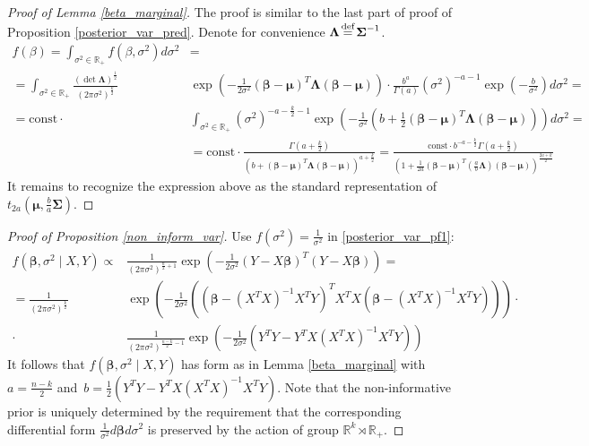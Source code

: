 \documentclass[10pt,fleqn]{amsart}
\theoremstyle{definition}
\theoremstyle{remark}
\numberwithin{equation}{section}
\newcommand{\RR}{\mathbb{R}}
\newcommand{\eq}{\stackrel{\mathclap{\normalfont\text{def}}}{=}}
\newcommand{\const}{\text{const}}
\newcommand{\bbeta}{\boldsymbol{\beta}}
\newcommand{\mmu}{\boldsymbol{\mu}}
\newcommand{\SSigma}{\boldsymbol{\Sigma}}
\newcommand{\LLambda}{\boldsymbol{\Lambda}}
\newcommand{\XTX}{X^TX}
\newcommand{\XTY}{X^TY}
\newcommand{\XTXi}{\left(X^TX\right)^{-1}}
\begin{document}
\begin{proof}[Proof of Lemma \ref{beta_marginal}]
The proof is similar to the last part of proof of Proposition \ref{posterior_var_pred}. Denote for convenience $\LLambda\eq\SSigma^{-1}$.
\begin{equation*}
    \begin{split}
        f(\beta)=\int_{\sigma^2\in\RR_+}f\left(\beta,\sigma^2\right)d\sigma^2&=\\
        =\int_{\sigma^2\in\RR_+}\frac{\left(\det\LLambda\right)^{\frac 12}}{\left(2\pi\sigma^2\right)^{\frac k2}}&
        \exp\left(-\frac 1{2\sigma^2}(\bbeta-\mmu)^T\LLambda(\bbeta-\mmu)\right)\cdot\frac{{b}^{a}}
        {\Gamma(a)}\left(\sigma^2\right)^{-a-1}\exp\left(-\frac{b}{\sigma^2}\right)d\sigma^2=\\
        =\const\cdot&\int_{\sigma^2\in\RR_+}\left(\sigma^2\right)^{-a-\frac k 2 -1}\exp\left(-\frac 1{\sigma^2}
        \left(b+\frac 12(\bbeta-\mmu)^T\LLambda(\bbeta-\mmu)\right)\right)d\sigma^2=\\
        &=\const\cdot \frac{\Gamma{\left(a+\frac k 2\right)}}{\left(b+(\bbeta-\mmu)^T\LLambda(\bbeta-\mmu)\right)^{a+\frac k 2}}=
        \frac{\const \cdot b^{-a-\frac k2}\Gamma{\left(a+\frac k 2\right)}}{\left(1+\frac 1{2a}(\bbeta-\mmu)^T\left(\frac ab\LLambda\right)(\bbeta-\mmu)\right)^{\frac {2a+k}2}}
    \end{split}
\end{equation*}
It remains to recognize the expression above as the standard representation of $t_{2a}\left(\mmu,\frac ba\SSigma\right)$.
\end{proof}
\begin{proof}[Proof of Proposition \ref{non_inform_var}]
Use $\displaystyle f(\sigma^2)=\frac 1 {\sigma^2}$ in \ref{posterior_var_pf1}:
\begin{equation*}
    \begin{split}
        f\left(\bbeta,\sigma^2\mid X,Y\right)\propto&\frac 1{\left(2\pi\sigma^2\right)^{\frac n 2+1}}
        \exp\left(-\frac 1{2\sigma^2}\left(Y-X\bbeta\right)^T\left(Y-X\bbeta\right)\right)=\\        
        =\frac 1{\left(2\pi\sigma^2\right)^{\frac k 2}}&
        \exp\left(-\frac 1{2\sigma^2}\left(\left(\bbeta-\XTXi\XTY\right)^T\XTX\left(\bbeta-\XTXi\XTY\right)\right)\right)\cdot \\
        \cdot&\frac 1{\left(2\pi\sigma^2\right)^{\frac {n-k}2-1}}
        \exp{\left(-\frac 1 {2\sigma^2}\left(Y^TY-Y^TX\XTXi\XTY \right)\right)}
    \end{split}
\end{equation*}
It follows that $f\left(\bbeta,\sigma^2\mid X,Y\right)$ has form as in Lemma \ref{beta_marginal}
with $\displaystyle a=\frac{n-k}2$ and~$\displaystyle b=\frac 12 \left(Y^TY-Y^TX\XTXi X^TY \right)$.
Note that the non-informative prior is uniquely determined by the requirement that the corresponding differential form
$\displaystyle \frac 1{\sigma^2}d\bbeta d\sigma^2$ is preserved by the action of group $\RR^k\rtimes \RR_+$.
\end{proof}
\end{document}
